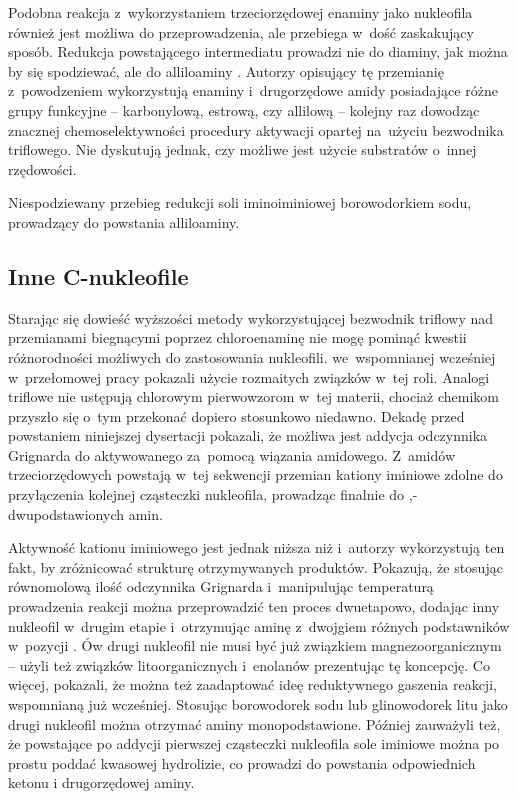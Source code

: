 Podobna reakcja z~wykorzystaniem trzeciorzędowej enaminy  jako nukleofila również jest możliwa do przeprowadzenia,
  ale przebiega w~dość zaskakujący sposób.
Redukcja powstającego intermediatu  prowadzi nie do diaminy,
  jak można by się spodziewać, ale do alliloaminy \autocite{huang18}.
Autorzy opisujący tę przemianię z~powodzeniem wykorzystują enaminy i~drugorzędowe amidy posiadające różne grupy funkcyjne \---
  karbonylową, estrową, czy allilową \--- kolejny raz dowodząc znacznej chemoselektywności procedury aktywacji opartej na~użyciu bezwodnika triflowego.
Nie dyskutują jednak, czy możliwe jest użycie substratów o~innej rzędowości.
\begin{scheme*}
  \centering
  
  \caption{
    Niespodziewany przebieg redukcji soli iminoiminiowej  borowodorkiem sodu,
    prowadzący do powstania alliloaminy.
  }
  \label{sch:allyloamine-synthesis}
\end{scheme*}

\subsection{Inne C-nukleofile}
Starając się dowieść wyższości metody wykorzystującej bezwodnik triflowy nad przemianami biegnącymi
  poprzez chloroenaminę nie mogę pominąć kwestii różnorodności możliwych do zastosowania nukleofili.
\citeauthor{ghosez69} we~wspomnianej wcześniej w~przełomowej pracy\autocite{ghosez69} pokazali użycie rozmaitych związków w~tej roli.
Analogi triflowe nie ustępują chlorowym pierwowzorom w~tej materii, chociaż chemikom przyszło się o~tym przekonać dopiero stosunkowo niedawno.
Dekadę przed powstaniem niniejszej dysertacji \citeauthor{xiao10} pokazali,
  że możliwa jest addycja odczynnika Grignarda do aktywowanego za~pomocą  wiązania amidowego\autocite{xiao10}.
Z~amidów trzeciorzędowych powstają w~tej sekwencji przemian kationy iminiowe zdolne do przyłączenia kolejnej cząsteczki nukleofila,
  prowadząc finalnie do \textalpha,\textalpha-dwupodstawionych amin.

Aktywność kationu iminiowego jest jednak niższa niż  i~autorzy wykorzystują ten fakt,
  by zróżnicować strukturę otrzymywanych produktów.
Pokazują, że stosując równomolową ilość odczynnika Grignarda i~manipulując temperaturą prowadzenia reakcji można przeprowadzić
  ten proces dwuetapowo, dodając inny nukleofil w~drugim etapie i~otrzymując aminę z~dwojgiem różnych podstawników w~pozycji \textalpha.
Ów drugi nukleofil nie musi być już związkiem magnezoorganicznym \---
  \citeauthor{xiao10} użyli też związków litoorganicznych i~enolanów prezentując tę koncepcję\autocite{xiao10}.
Co więcej, pokazali, że można też zaadaptować ideę reduktywnego gaszenia reakcji, wspomnianą już wcześniej\autocite{belanger15}.
Stosując borowodorek sodu lub glinowodorek litu jako drugi nukleofil można otrzymać aminy monopodstawione\autocite{xiao10eurj}.
Później zauważyli też, że powstające po addycji pierwszej cząsteczki nukleofila sole iminiowe 
  można po prostu poddać kwasowej hydrolizie, co prowadzi do powstania odpowiednich ketonu i drugorzędowej aminy\autocite{huang15tet}.

